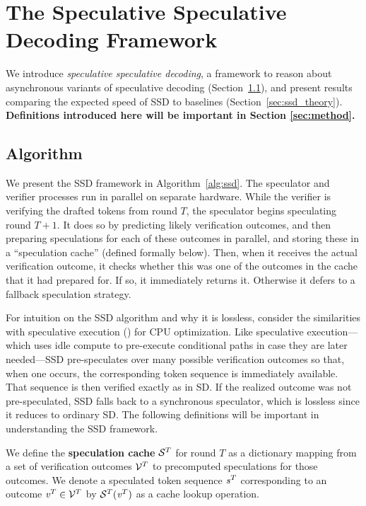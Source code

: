 \section{The Speculative Speculative Decoding Framework}
\label{sec:ssd}

We introduce \textit{speculative speculative decoding}, a framework to reason about asynchronous variants of speculative decoding (Section~\ref{sec:ssd_alg}), and present results comparing the expected speed of SSD to baselines (Section~\ref{sec:ssd_theory}). \textbf{Definitions introduced here will be important in Section \ref{sec:method}.}

\subsection{Algorithm}
\label{sec:ssd_alg}

We present the SSD framework in Algorithm~\ref{alg:ssd}.
The speculator and verifier processes run in parallel on separate hardware.
While the verifier is verifying the drafted tokens from round $T$, the speculator begins speculating round $T+1$. 
It does so by predicting likely verification outcomes, and then preparing speculations for each of these outcomes in parallel, and storing these in a ``speculation cache'' (defined formally below).
Then, when it receives the actual verification outcome, it checks whether this was one of the outcomes in the cache that it had prepared for. If so, it immediately returns it.
Otherwise it defers to a fallback speculation strategy. 

For intuition on the SSD algorithm and why it is lossless, consider the similarities with speculative execution (\cite{specexec97}) for CPU optimization. 
Like speculative execution---which uses idle compute to pre-execute conditional paths in case they are later needed---SSD pre-speculates over many possible verification outcomes so that, when one occurs, the corresponding token sequence is immediately available.
That sequence is then verified exactly as in SD.
If the realized outcome was not pre-speculated, SSD falls back to a synchronous speculator, which is lossless since it reduces to ordinary SD. The following definitions will be important in understanding the SSD framework.



\begin{definition}
    We define the \textbf{speculation cache} $\mathcal{S}^T$ for round $T$ as a dictionary mapping from a set of verification outcomes $\mathcal{V}^T$ to precomputed speculations for those outcomes.
    We denote a speculated token sequence $\mathit{s}^{T}$ corresponding to an outcome $\mathit{v}^T \in \mathcal{V}^T$ by $\mathcal{S}^T(\mathit{v}^{T})$ as a cache lookup operation.
\end{definition}

